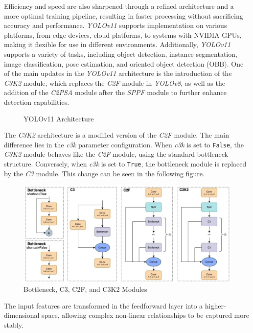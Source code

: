 Efficiency and speed are also sharpened through a refined architecture and a more optimal training pipeline, resulting in faster processing without sacrificing accuracy and performance. \emph{YOLOv11} supports implementation on various platforms, from edge devices, cloud platforms, to systems with NVIDIA GPUs, making it flexible for use in different environments. Additionally, \emph{YOLOv11} supports a variety of tasks, including object detection, instance segmentation, image classification, pose estimation, and oriented object detection (OBB). One of the main updates in the \emph{YOLOv11} architecture is the introduction of the \emph{C3K2} module, which replaces the \emph{C2F} module in \emph{YOLOv8}, as well as the addition of the \emph{C2PSA} module after the \emph{SPPF} module to further enhance detection capabilities.

\begin{figure}[H]
  \centering
  \resizebox{1\linewidth}{!}{
    
  }
  \caption{YOLOv11 Architecture}
  \label{fig:YOLOv11Architecture}
\end{figure}

The \emph{C3K2} architecture is a modified version of the \emph{C2F} module. The main difference lies in the \emph{c3k} parameter configuration. When \emph{c3k} is set to \texttt{False}, the \emph{C3K2} module behaves like the \emph{C2F} module, using the standard bottleneck structure. Conversely, when \emph{c3k} is set to \texttt{True}, the bottleneck module is replaced by the \emph{C3} module. This change can be seen in the following figure.

\begin{figure}[H]
  \centering
  \includegraphics[scale=0.35]{gambar/C3k2.jpg}
  \caption{Bottleneck, C3, C2F, and C3K2 Modules}
  \label{fig:c3k2}
\end{figure}

The input features are transformed in the feedforward layer into a higher-dimensional space, allowing complex non-linear relationships to be captured more stably.

